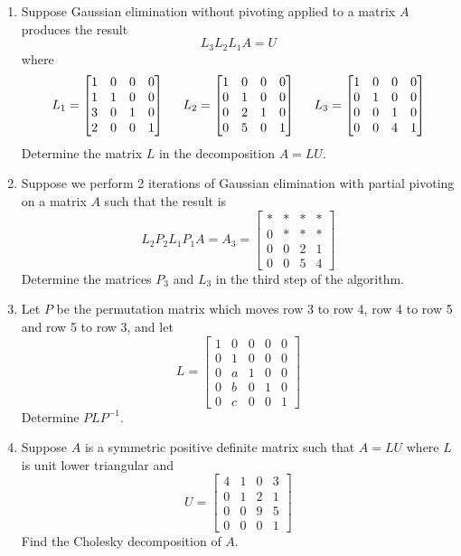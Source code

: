 \begin{enumerate}[leftmargin=*]
\item Suppose Gaussian elimination without pivoting applied to a matrix $A$ produces the result
$$
L_3 L_2 L_1 A = U
$$
where
$$
L_1 = \begin{bmatrix} 1 & 0 & 0 & 0 \\ 1 & 1 & 0 & 0 \\ 3 & 0 & 1 & 0 \\ 2 & 0 & 0 & 1 \end{bmatrix}
\hspace{5mm}
L_2 = \begin{bmatrix} 1 & 0 & 0 & 0 \\ 0 & 1 & 0 & 0 \\ 0 & 2 & 1 & 0 \\ 0 & 5 & 0 & 1 \end{bmatrix}
\hspace{5mm}
L_3 = \begin{bmatrix} 1 & 0 & 0 & 0 \\ 0 & 1 & 0 & 0 \\ 0 & 0 & 1 & 0 \\ 0 & 0 & 4 & 1 \end{bmatrix}
$$
Determine the matrix $L$ in the decomposition $A = LU$.

\item Suppose we perform 2 iterations of Gaussian elimination with partial pivoting on a matrix $A$ such that the result is
$$
L_2 P_2 L_1 P_1 A = A_3 =
\begin{bmatrix} * & * & * & * \\ 0 & * & * & * \\ 0 & 0 & 2 & 1 \\ 0 & 0 & 5 & 4 \end{bmatrix}
$$
Determine the matrices $P_3$ and $L_3$ in the third step of the algorithm.

\item Let $P$ be the permutation matrix which moves row 3 to row 4, row 4 to row 5 and row 5 to row 3, and let 
$$
L = \begin{bmatrix} 1 & 0 & 0 & 0 & 0 \\ 0 & 1 & 0 & 0 & 0 \\ 0 & a & 1 & 0 & 0 \\ 0 & b & 0 & 1 & 0 \\ 0 & c & 0 & 0 & 1  \end{bmatrix}
$$
Determine $PLP^{-1}$.

\item Suppose $A$ is a symmetric positive definite matrix such that $A = LU$ where $L$ is unit lower triangular and 
$$
U = \begin{bmatrix} 4 & 1 & 0 & 3 \\ 0 & 1 & 2 & 1 \\ 0 & 0 & 9 & 5 \\ 0 & 0 & 0 & 1 \end{bmatrix}
$$
Find the Cholesky decomposition of $A$.


\end{enumerate}

